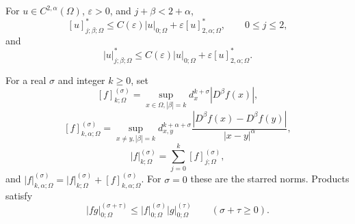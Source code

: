 For $u\in C^{2,\alpha}(\Omega)$, $\varepsilon>0$, and
$j+\beta<2+\alpha$,
\begin{equation}\tag{6.8}
[u]^*_{j;\beta;\Omega}\le C(\varepsilon)|u|_{0;\Omega}+\varepsilon [u]^*_{2,\alpha;\Omega},
\qquad 0\le j\le2,
\end{equation}
and
\begin{equation}\tag{6.9}
|u|^*_{j;\beta;\Omega}\le C(\varepsilon)|u|_{0;\Omega}+\varepsilon [u]^*_{2,\alpha;\Omega}.
\end{equation}

For a real $\sigma$ and integer $k\ge0$, set
\[
[f]_{k;\Omega}^{(\sigma)}=\sup_{x\in\Omega,|\beta|=k}d_x^{k+\sigma}|D^\beta f(x)|,
\]
\[
[f]_{k,\alpha;\Omega}^{(\sigma)}=
\sup_{x\ne y,|\beta|=k}d_{x,y}^{k+\alpha+\sigma}
\frac{|D^\beta f(x)-D^\beta f(y)|}{|x-y|^\alpha},
\]
\begin{equation}
\tag{6.10}
|f|_{k;\Omega}^{(\sigma)}=\sum_{j=0}^k[f]_{j;\Omega}^{(\sigma)},
\end{equation}
and $|f|_{k,\alpha;\Omega}^{(\sigma)}=|f|_{k;\Omega}^{(\sigma)}
+[f]_{k,\alpha;\Omega}^{(\sigma)}$.
For $\sigma=0$ these are the starred norms.  Products satisfy
\begin{equation}\tag{6.11}
|fg|_{0;\Omega}^{(\sigma+\tau)}
\le |f|_{0;\Omega}^{(\sigma)}|g|_{0;\Omega}^{(\tau)}\qquad(\sigma+\tau\ge0).
\end{equation}

